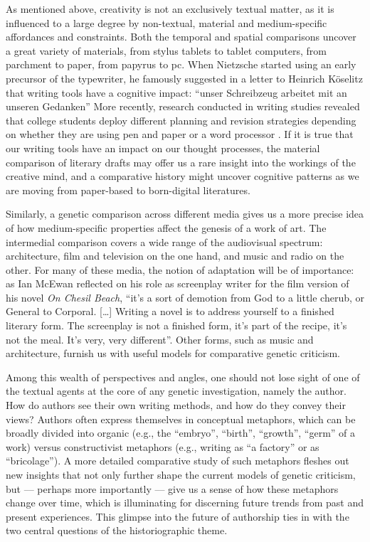 \begin{preface}
As mentioned above, \label{qtVanhulle1}creativity is not an exclusively textual matter, as
it is influenced to a large degree by non-textual, material and
medium-specific affordances and constraints. Both the temporal and
spatial comparisons uncover a great variety of materials, from stylus
tablets to tablet computers, from parchment to paper, from papyrus to
pc. When Nietzsche started using an early precursor of the typewriter,
he famously suggested in a letter to Heinrich Köselitz that writing
tools have a cognitive impact: ``unser Schreibzeug arbeitet mit an
unseren Gedanken'' \parencite[``our writing tools assist in our
thought processes''; qtd. in][15]{van_hulle_towards_2019} More
recently, research conducted in writing studies revealed that college
students deploy different planning and revision strategies depending on
whether they are using pen and paper or a word processor \parencite{hayes_new_1996,van_waes_writing_2003}. If it is true that our writing tools have
an impact on our thought processes, the material comparison of literary
drafts may offer us a rare insight into the workings of the creative
mind, and a comparative history might uncover cognitive patterns as we
are moving from paper-based to born-digital literatures.

Similarly,  a genetic comparison across different media gives us a more
precise idea of how medium-specific properties affect the genesis of a
work of art. The intermedial comparison covers a wide range of the
audiovisual spectrum: architecture, film and television on
the one hand, and music and radio on the other. For many of these media,
the notion of adaptation will be of importance: as Ian McEwan reflected
on his role as screenplay writer for the film version of his novel
\emph{On Chesil Beach}, ``it's a sort of demotion from God to a little
cherub, or General to Corporal. {[}\ldots{]} Writing a novel is to
address yourself to a finished literary form. The screenplay is not a
finished form, it's part of the recipe, it's not the meal. It's very,
very different''\parencite[qtd. in][]{noauthor_ian_2018}.
Other forms, such as music and architecture, furnish us with useful
models for comparative genetic criticism.

Among this wealth of perspectives and angles, one should not lose sight
of one of the textual agents at the core of any genetic investigation,
namely the author. How do authors see their own writing methods, and how
do they convey their views? Authors often express themselves in
conceptual metaphors, which can be broadly divided into organic (e.g., 
the ``embryo'', ``birth'', ``growth'', ``germ'' of a work) versus
constructivist metaphors (e.g., writing as ``a factory'' or as
``bricolage''). A more detailed comparative study of such metaphors
fleshes out new insights that not only further shape the current models
of genetic criticism, but –– perhaps more importantly –– give us a sense
of how these metaphors change over time, which is illuminating for
discerning future trends from past and present experiences. This glimpse
into the future of authorship ties in with the two central questions of
the historiographic theme.


\end{preface}

